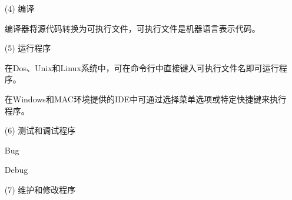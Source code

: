 \begin{frame}\ft{\secname}
\begin{itemize}
\item[(4)] 编译 \\[0.1in]
\item[] 编译器将源代码转换为可执行文件，可执行文件是机器语言表示代码。\\[0.2in]
\item[(5)] 运行程序 \\[0.1in]
\item[] 在Dos、Unix和Linux系统中，可在命令行中直接键入可执行文件名即可运行程序。\\[0.1in]
\item[] 在Windows和MAC环境提供的IDE中可通过选择菜单选项或特定快捷键来执行程序。 
\end{itemize} 
 
\end{frame}

\begin{frame}[fragile]\ft{\secname}
\begin{itemize}
\item[(6)] 测试和调试程序\\[0.1in]
\item[] Bug\\[0.1in]
\item[] Debug\\[0.2in]

\item[(7)]  维护和修改程序\\[0.1in]
\end{itemize} 
 
\end{frame}




